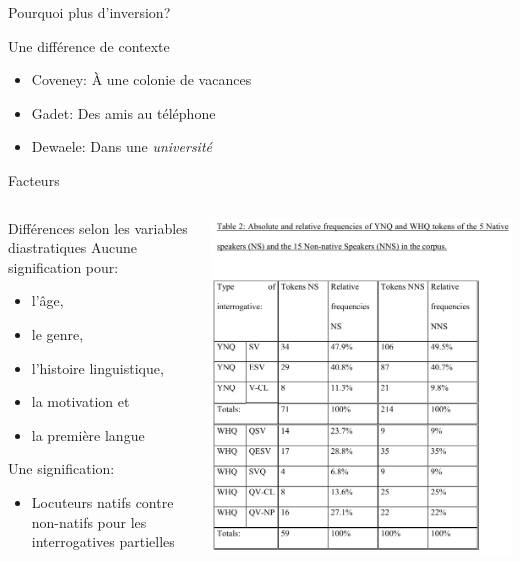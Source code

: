 \documentclass{beamer}
\begin{document}
    \begin{frame}{Pourquoi plus d'inversion?}
      \begin{block}{Une différence de contexte}
        \begin{itemize}
          \item Coveney: À une colonie de vacances
          \item Gadet: Des amis au téléphone
          \item Dewaele: Dans une \emph{université}
        \end{itemize}
      \end{block}
    \end{frame}

    \begin{frame}[t]{Facteurs}
      \begin{columns}
          \begin{block}{Différences selon les variables diastratiques}
            Aucune signification pour:
            \begin{itemize}
              \item l'âge,
              \item le genre,
              \item l'histoire linguistique,
              \item la motivation et
              \item la première langue
            \end{itemize}
            Une signification:
            \begin{itemize}
              \item Locuteurs natifs contre non-natifs pour les interrogatives partielles
            \end{itemize}
          \end{block}
          \includegraphics[scale=0.32]{resultats.jpg}

\end{columns}
\end{frame}
\end{document}
